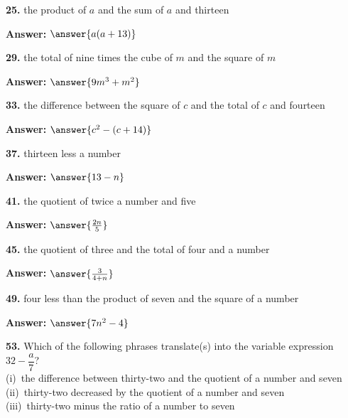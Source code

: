 \documentclass{ximera}
\begin{document}
\begin{problem}
\textbf{25.} the product of $a$ and the sum of $a$ and thirteen

\textbf{Answer:} $\answer{a(a+13)}$
\end{problem}

\begin{problem}
\textbf{29.} the total of nine times the cube of $m$ and the square of $m$

\textbf{Answer:} $\answer{9m^3+m^2}$
\end{problem}

\begin{problem}
\textbf{33.} the difference between the square of $c$ and the total of $c$ and fourteen

\textbf{Answer:} $\answer{c^2-(c+14)}$
\end{problem}

\begin{problem}
\textbf{37.} thirteen less a number

\textbf{Answer:} $\answer{13-n}$
\end{problem}

\begin{problem}
\textbf{41.} the quotient of twice a number and five

\textbf{Answer:} $\answer{\frac{2n}{5}}$
\end{problem}

\begin{problem}
\textbf{45.} the quotient of three and the total of four and a number

\textbf{Answer:} $\answer{\frac{3}{4+n}}$
\end{problem}

\begin{problem}
\textbf{49.} four less than the product of seven and the square of a number

\textbf{Answer:} $\answer{7n^2-4}$
\end{problem}

\begin{problem}
\textbf{53.} Which of the following phrases translate(s) into the variable expression
  $32 - \dfrac{a}{7}$?
  \\[2pt]
  (i)~the difference between thirty-two and the quotient of a number and seven\\
  (ii)~thirty-two decreased by the quotient of a number and seven\\
  (iii)~thirty-two minus the ratio of a number to seven

\begin{multipleChoice}
\end{multipleChoice}
\end{problem}
\end{document}
